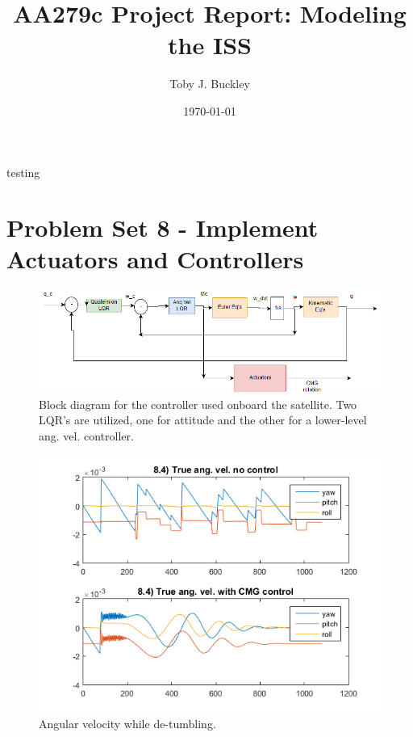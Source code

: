 \documentclass[12pt, letterpaper]{article}
\title{AA279c Project Report: Modeling the ISS}
\author{Toby J. Buckley}
\date{\today}
\begin{document}
\begin{titlepage}
	\maketitle
\end{titlepage}


testing






\section{Problem Set 8 - Implement Actuators and Controllers}

\begin{figure}[H]
	\centering
	\includegraphics[scale=0.7]{PS8_controller}
	\caption{Block diagram for the controller used onboard the satellite. Two LQR's are utilized, one for attitude and the other for a lower-level ang. vel. controller.}
	\label{8:controller}
\end{figure}


\begin{figure}[H]
	\centering
	\includegraphics[scale=0.9]{ps8_01}
	\caption{Angular velocity while de-tumbling.}
	\label{8:angvel}
\end{figure}
\end{document}
